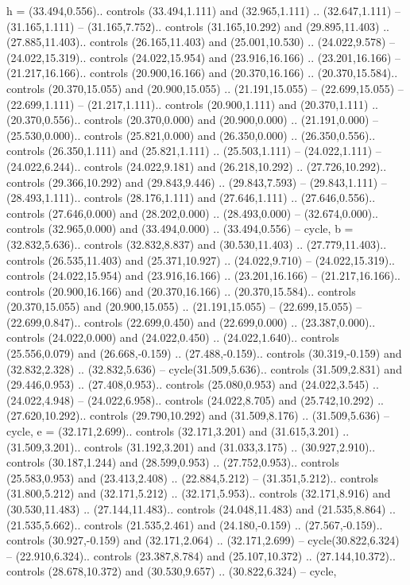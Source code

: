 {h} = {(33.494,0.556).. controls (33.494,1.111) and (32.965,1.111) .. (32.647,1.111) -- (31.165,1.111) -- (31.165,7.752).. controls (31.165,10.292) and (29.895,11.403) .. (27.885,11.403).. controls (26.165,11.403) and (25.001,10.530) .. (24.022,9.578) -- (24.022,15.319).. controls (24.022,15.954) and (23.916,16.166) .. (23.201,16.166) -- (21.217,16.166).. controls (20.900,16.166) and (20.370,16.166) .. (20.370,15.584).. controls (20.370,15.055) and (20.900,15.055) .. (21.191,15.055) -- (22.699,15.055) -- (22.699,1.111) -- (21.217,1.111).. controls (20.900,1.111) and (20.370,1.111) .. (20.370,0.556).. controls (20.370,0.000) and (20.900,0.000) .. (21.191,0.000) -- (25.530,0.000).. controls (25.821,0.000) and (26.350,0.000) .. (26.350,0.556).. controls (26.350,1.111) and (25.821,1.111) .. (25.503,1.111) -- (24.022,1.111) -- (24.022,6.244).. controls (24.022,9.181) and (26.218,10.292) .. (27.726,10.292).. controls (29.366,10.292) and (29.843,9.446) .. (29.843,7.593) -- (29.843,1.111) -- (28.493,1.111).. controls (28.176,1.111) and (27.646,1.111) .. (27.646,0.556).. controls (27.646,0.000) and (28.202,0.000) .. (28.493,0.000) -- (32.674,0.000).. controls (32.965,0.000) and (33.494,0.000) .. (33.494,0.556) -- cycle},
{b} = {(32.832,5.636).. controls (32.832,8.837) and (30.530,11.403) .. (27.779,11.403).. controls (26.535,11.403) and (25.371,10.927) .. (24.022,9.710) -- (24.022,15.319).. controls (24.022,15.954) and (23.916,16.166) .. (23.201,16.166) -- (21.217,16.166).. controls (20.900,16.166) and (20.370,16.166) .. (20.370,15.584).. controls (20.370,15.055) and (20.900,15.055) .. (21.191,15.055) -- (22.699,15.055) -- (22.699,0.847).. controls (22.699,0.450) and (22.699,0.000) .. (23.387,0.000).. controls (24.022,0.000) and (24.022,0.450) .. (24.022,1.640).. controls (25.556,0.079) and (26.668,-0.159) .. (27.488,-0.159).. controls (30.319,-0.159) and (32.832,2.328) .. (32.832,5.636) -- cycle(31.509,5.636).. controls (31.509,2.831) and (29.446,0.953) .. (27.408,0.953).. controls (25.080,0.953) and (24.022,3.545) .. (24.022,4.948) -- (24.022,6.958).. controls (24.022,8.705) and (25.742,10.292) .. (27.620,10.292).. controls (29.790,10.292) and (31.509,8.176) .. (31.509,5.636) -- cycle},
{e} = {(32.171,2.699).. controls (32.171,3.201) and (31.615,3.201) .. (31.509,3.201).. controls (31.192,3.201) and (31.033,3.175) .. (30.927,2.910).. controls (30.187,1.244) and (28.599,0.953) .. (27.752,0.953).. controls (25.583,0.953) and (23.413,2.408) .. (22.884,5.212) -- (31.351,5.212).. controls (31.800,5.212) and (32.171,5.212) .. (32.171,5.953).. controls (32.171,8.916) and (30.530,11.483) .. (27.144,11.483).. controls (24.048,11.483) and (21.535,8.864) .. (21.535,5.662).. controls (21.535,2.461) and (24.180,-0.159) .. (27.567,-0.159).. controls (30.927,-0.159) and (32.171,2.064) .. (32.171,2.699) -- cycle(30.822,6.324) -- (22.910,6.324).. controls (23.387,8.784) and (25.107,10.372) .. (27.144,10.372).. controls (28.678,10.372) and (30.530,9.657) .. (30.822,6.324) -- cycle},
